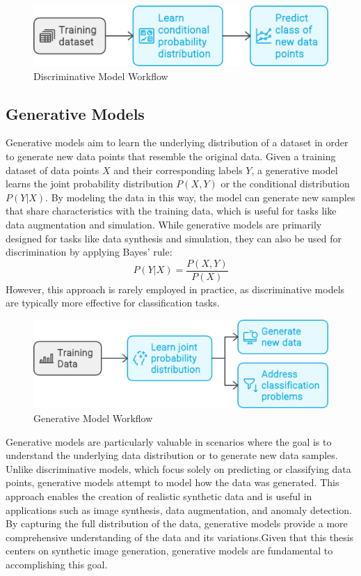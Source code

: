 \documentclass[12pt,DIV14,BCOR12mm,a4paper,footinclude=false,headinclude,parskip=half-,twoside,openright,cleardoublepage=empty,toc=index,bibliography=totoc,listof=totoc]{scrreprt}
\numberwithin{equation}{chapter}
\begin{document}
\begin{figure}
	\centering
	\includegraphics[scale=.3]{../media/Discriminative_model.png}
	\caption{Discriminative Model Workflow~\cite{Nanda:2024}}
	\label{disc}
\end{figure}

\subsection{Generative Models}
Generative models aim to learn the underlying distribution of a dataset in order to generate new data points that resemble the original data. Given a training dataset of data points \( X \) and their corresponding labels \( Y \), a generative model learns the joint probability distribution \( P(X, Y) \) or the conditional distribution \( P(Y|X) \). By modeling the data in this way, the model can generate new samples that share characteristics with the training data, which is useful for tasks like data augmentation and simulation. While generative models are primarily designed for tasks like data synthesis and simulation, they can also be used for discrimination by applying Bayes’ rule: 
\begin{equation}
P(Y|X) = \frac{P(X, Y)}{P(X)}
\end{equation}
However, this approach is rarely employed in practice, as discriminative models are typically more effective for classification tasks.
\begin{figure}
	\centering
	\includegraphics[scale=.3]{../media/Generative Model.png}
	\caption{Generative Model Workflow\cite{Nanda:2024}}
	\label{gen}
\end{figure}
Generative models are particularly valuable in scenarios where the goal is to understand the underlying data distribution or to generate new data samples. Unlike discriminative models, which focus solely on predicting or classifying data points, generative models attempt to model how the data was generated. This approach enables the creation of realistic synthetic data and is useful in applications such as image synthesis, data augmentation, and anomaly detection. By capturing the full distribution of the data, generative models provide a more comprehensive understanding of the data and its variations.Given that this thesis centers on synthetic image generation, generative models are fundamental to accomplishing this goal.
\end{document}
